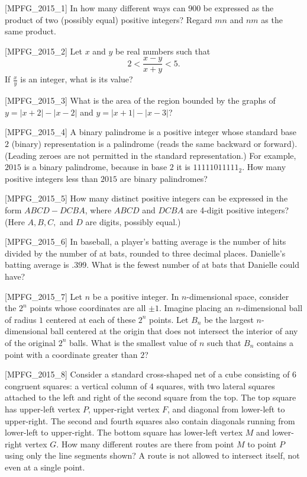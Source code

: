 [MPFG_2015_1]
In how many different ways can $900$ be expressed as the product of two (possibly equal) positive integers? Regard $mn$ and $nm$ as the same product.

[MPFG_2015_2]
Let $x$ and $y$ be real numbers such that
$$2 < \frac{x-y}{x+y} < 5.$$
If $\frac{x}{y}$ is an integer, what is its value?

[MPFG_2015_3]
What is the area of the region bounded by the graphs of $y = |x+2| - |x-2|$ and $y = |x+1| - |x-3|$?

[MPFG_2015_4]
A binary palindrome is a positive integer whose standard base $2$ (binary) representation is a palindrome (reads the same backward or forward). (Leading zeroes are not permitted in the standard representation.) For example, $2015$ is a binary palindrome, because in base $2$ it is $11111011111_2$. How many positive integers less than $2015$ are binary palindromes?

[MPFG_2015_5]
How many distinct positive integers can be expressed in the form $ABCD - DCBA$, where $ABCD$ and $DCBA$ are 4-digit positive integers? (Here $A, B, C,$ and $D$ are digits, possibly equal.)

[MPFG_2015_6]
In baseball, a player's batting average is the number of hits divided by the number of at bats, rounded to three decimal places. Danielle's batting average is $.399$. What is the fewest number of at bats that Danielle could have?

[MPFG_2015_7]
Let $n$ be a positive integer. In $n$-dimensional space, consider the $2^n$ points whose coordinates are all $\pm 1$. Imagine placing an $n$-dimensional ball of radius $1$ centered at each of these $2^n$ points. Let $B_n$ be the largest $n$-dimensional ball centered at the origin that does not intersect the interior of any of the original $2^n$ balls. What is the smallest value of $n$ such that $B_n$ contains a point with a coordinate greater than $2$?

[MPFG_2015_8]
Consider a standard cross-shaped net of a cube consisting of 6 congruent squares: a vertical column of 4 squares, with two lateral squares attached to the left and right of the second square from the top. The top square has upper-left vertex $P$, upper-right vertex $F$, and diagonal from lower-left to upper-right. The second and fourth squares also contain diagonals running from lower-left to upper-right. The bottom square has lower-left vertex $M$ and lower-right vertex $G$. How many different routes are there from point $M$ to point $P$ using only the line segments shown? A route is not allowed to intersect itself, not even at a single point.

